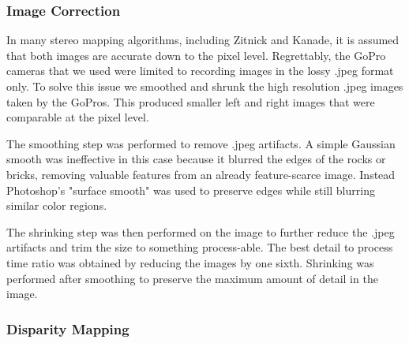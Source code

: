 \documentclass[a4paper,twoside]{article}
\begin{document}
\subsubsection{Image Correction}
\label{subsec:image_correction}

In many stereo mapping algorithms, including Zitnick and Kanade, it is assumed that both images are accurate down to the pixel level.
Regrettably, the GoPro cameras that we used were limited to recording images in the lossy .jpeg format only.
To solve this issue we smoothed and shrunk the high resolution .jpeg images taken by the GoPros. 
This produced smaller left and right images that were comparable at the pixel level.

The smoothing step was performed to remove .jpeg artifacts.
  A simple Gaussian smooth was ineffective in this case because it blurred the edges of the rocks or bricks, removing valuable features from an already feature-scarce image.
  Instead Photoshop's "surface smooth" was used to preserve edges while still blurring similar color regions.

The shrinking step was then performed on the image to further reduce the .jpeg artifacts and trim the size to something process-able.  
The best detail to process time ratio was obtained by reducing the images by one sixth.   
Shrinking was performed after smoothing to preserve the maximum amount of detail in the image.  


\subsubsection{Disparity Mapping}
\label{subsec:disparity_mapping}
\end{document}
